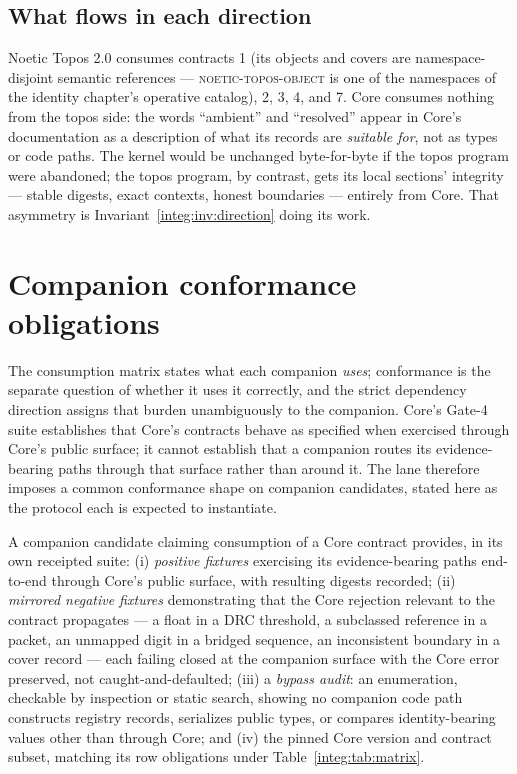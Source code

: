\subsection{What flows in each direction}\label{integ:topos:direction}
Noetic Topos 2.0 consumes contracts 1 (its objects and covers are namespace-disjoint semantic references --- \textsc{noetic-topos-object} is one of the namespaces of the identity chapter's operative catalog), 2, 3, 4, and 7. Core consumes nothing from the topos side: the words ``ambient'' and ``resolved'' appear in Core's documentation as a description of what its records are \emph{suitable for}, not as types or code paths. The kernel would be unchanged byte-for-byte if the topos program were abandoned; the topos program, by contrast, gets its local sections' integrity --- stable digests, exact contexts, honest boundaries --- entirely from Core. That asymmetry is Invariant~\ref{integ:inv:direction} doing its work.

\section{Companion conformance obligations}\label{integ:conformance}

The consumption matrix states what each companion \emph{uses}; conformance is the separate question of whether it uses it correctly, and the strict dependency direction assigns that burden unambiguously to the companion. Core's Gate-4 suite establishes that Core's contracts behave as specified when exercised through Core's public surface; it cannot establish that a companion routes its evidence-bearing paths through that surface rather than around it. The lane therefore imposes a common conformance shape on companion candidates, stated here as the protocol each is expected to instantiate.

\begin{protocol}\label{integ:prot:conformance}
A companion candidate claiming consumption of a Core contract provides, in its own receipted suite: (i) \emph{positive fixtures} exercising its evidence-bearing paths end-to-end through Core's public surface, with resulting digests recorded; (ii) \emph{mirrored negative fixtures} demonstrating that the Core rejection relevant to the contract propagates --- a float in a DRC threshold, a subclassed reference in a packet, an unmapped digit in a bridged sequence, an inconsistent boundary in a cover record --- each failing closed at the companion surface with the Core error preserved, not caught-and-defaulted; (iii) a \emph{bypass audit}: an enumeration, checkable by inspection or static search, showing no companion code path constructs registry records, serializes public types, or compares identity-bearing values other than through Core; and (iv) the pinned Core version and contract subset, matching its row obligations under Table~\ref{integ:tab:matrix}.
\end{protocol}

